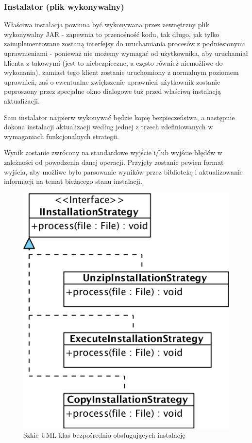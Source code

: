 \documentclass[polish,12pt,titlepage]{article}
\begin{document}
\subsubsection{Instalator (plik wykonywalny)}

Właściwa instalacja powinna być wykonywana przez zewnętrzny plik wykonywalny
JAR - zapewnia to przenośność kodu, tak długo, jak tylko zaimplementowane
zostaną interfejsy do uruchamiania procesów z podniesionymi uprawnieniami - 
ponieważ nie możemy wymagać od użytkownika, aby uruchamiał klienta z takowymi
(jest to niebezpieczne, a często również niemożliwe do wykonania), zamiast
tego klient zostanie uruchomiony z normalnym poziomem uprawnień, zaś o
ewentualne zwiększenie uprawnień użytkownik zostanie poproszony przez
specjalne okno dialogowe tuż przed właściwą instalacją aktualizacji.

Sam instalator najpierw wykonywać będzie kopię bezpieczeństwa, a następnie 
dokona instalacji aktualizacji według jednej z trzech zdefiniowanych w
wymaganiach funkcjonalnych strategii.

Wynik zostanie zwrócony na standardowe wyjście i/lub wyjście błędów
w zależności od powodzenia danej operacji. Przyjęty zostanie pewien format
wyjścia, aby możliwe było parsowanie wyników przez bibliotekę i aktualizowanie
informacji na temat bieżącego stanu instalacji.

\begin{figure}[!ht]
\centering
\includegraphics[bb=0 0 475 542, scale=0.50]{Installer.png}
\caption{Szkic UML klas bezpośrednio obsługujących instalację}
\end{figure}
\end{document}
